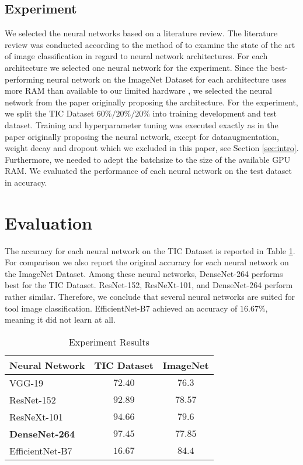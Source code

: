 \documentclass[a4paper, 10pt, journal]{wissarbIEEE}
\begin{document}
\subsection{Experiment}
We selected the neural networks based on a literature review. The literature review was conducted according to the method of \cite{Webster.2002} to examine the state of the art of image classification in regard to neural network architectures. For each architecture we selected one neural network for the experiment. Since the best-performing neural network on the ImageNet Dataset for each architecture uses more RAM than available to our limited hardware \cite{Foret.2020, Kolesnikov.2019, Touvron.2019}, we selected the neural network from the paper originally proposing the architecture. For the experiment, we split the TIC Dataset $60\%/20\%/20\%$ into training development and test dataset.
Training and hyperparameter tuning was executed exactly as in the paper originally proposing the neural network, except for dataaugmentation, weight decay and dropout which we excluded in this paper, see Section \ref{sec:intro}. Furthermore, we needed to adept the batchsize to the size of the available GPU RAM. We evaluated the performance of each neural network on the test dataset in accuracy.

\section{Evaluation}
\label{sec:eval}
The accuracy for each neural network on the TIC Dataset is reported in Table \ref{tab:acc}. For comparison we also report the original accuracy for each  neural network on the ImageNet Dataset.
Among these neural networks, DenseNet-264 performs best for the {TIC Dataset}. ResNet-152, ResNeXt-101, and DenseNet-264 perform rather similar. Therefore, we conclude that several neural networks are suited for tool image classification.  
EfficientNet-B7 achieved an accuracy of $16.67\%$, meaning it did not learn at all.
\begin{table}[h]
\caption{Experiment Results} \label{tab:acc}
	\begin{tabularx}{0.48\textwidth}{Xcc}
		\toprule 
		\textbf{Neural Network} & \textbf{TIC Dataset} & \textbf{ImageNet} \\\midrule
		VGG-19 & $72.40$ & $76.3$ \cite{Simonyan.2014}\\
		ResNet-152 & $92.89$ & $78.57$ \cite{He.2016}\\
		ResNeXt-101 & $94.66$ & $79.6$ \cite{Xie.2017} \\
		\textbf{DenseNet-264} & $\mathbf{97.45}$ & $77.85$ \cite{Huang.2017}\\
		EfficientNet-B7 & $16.67$ & $84.4$ \cite{Tan.2019}\\
		\bottomrule
	\end{tabularx}
\end{table}
\end{document}

